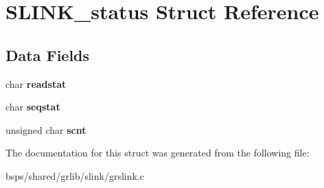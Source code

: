 \hypertarget{structSLINK__status}{}\section{S\+L\+I\+N\+K\+\_\+status Struct Reference}
\label{structSLINK__status}
\subsection*{Data Fields}
\begin{DoxyCompactItemize}
\item 
\mbox{\label{structSLINK__status_ada7387dd69d94a9fa2b6e1f43058787e}} 
char {\bfseries readstat}
\item 
\mbox{\label{structSLINK__status_a2503f4e0e73aa74c514957006d11717f}} 
char {\bfseries seqstat}
\item 
\mbox{\label{structSLINK__status_a0769f1c93d266d77ad80ce8f93dccd64}} 
unsigned char {\bfseries scnt}
\end{DoxyCompactItemize}


The documentation for this struct was generated from the following file\+:\begin{DoxyCompactItemize}
\item 
bsps/shared/grlib/slink/grslink.\+c\end{DoxyCompactItemize}
